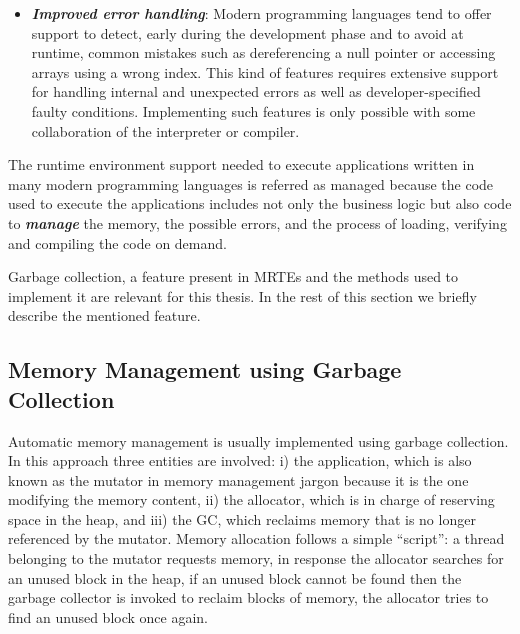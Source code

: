 \begin{itemize}
\item \textbf{\textit{Improved error handling}}:
Modern programming languages tend to offer support to detect, early during the development phase and to avoid at runtime, common mistakes such as dereferencing a null pointer or accessing arrays using a wrong index.
This kind of features requires extensive support for handling internal and unexpected errors as well as developer-specified faulty conditions.
Implementing such features is only possible with some collaboration of the interpreter or  compiler.
\end{itemize}   

The runtime environment support needed to execute applications written in many modern programming languages is referred as managed because the code used to execute the applications includes not only the business logic but also code to \textit{\textbf{manage}} the memory, the possible errors, and the process of loading, verifying and compiling the code on demand.

Garbage collection, a feature present in MRTEs and the methods used to implement it are relevant for this thesis.
In the rest of this section we briefly describe the mentioned feature.

\subsection{Memory Management using Garbage Collection}

Automatic memory management is usually implemented using garbage collection.
In this approach three entities are involved: i) the application, which is also known as the mutator in memory management jargon because it is the one modifying the memory content, ii) the allocator, which is in charge of reserving space in the heap, and iii) the \gls{GC}, which reclaims memory that is no longer referenced by the mutator.
Memory allocation follows a simple ``script'': a thread belonging to the mutator requests memory, in response the allocator searches for an unused block in the heap, if an unused block cannot be found then the garbage collector is invoked to reclaim blocks of memory, the allocator tries to find an unused block once again.

